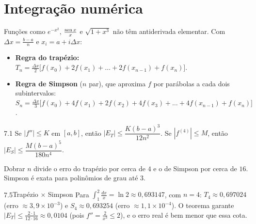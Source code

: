 \section{Integração numérica}

Funções como $e^{-x^2}$, $\frac{\operatorname{sen} x}x$ e $\sqrt{1+x^3}$ não têm antiderivada elementar. Com
$\Delta x=\frac{b-a}n$ e $x_i=a+i\Delta x$:
\begin{itemize}
\item \textbf{Regra do trapézio:}
  $T_n=\frac{\Delta x}2\big[f(x_0)+2f(x_1)+\dots+2f(x_{n-1})+f(x_n)\big]$.
\item \textbf{Regra de Simpson} ($n$ par), que aproxima $f$ por parábolas a cada dois
  subintervalos:
  $S_n=\frac{\Delta x}3\big[f(x_0)+4f(x_1)+2f(x_2)+4f(x_3)+\dots+4f(x_{n-1})+f(x_n)\big]$.
\end{itemize}

\begin{teorema}{7.1}
Se $|f''|\le K$ em $[a,b]$, então $|E_T|\le\dfrac{K(b-a)^3}{12n^2}$. Se $|f^{(4)}|\le M$, então
$|E_S|\le\dfrac{M(b-a)^5}{180n^4}$.
\end{teorema}

Dobrar $n$ divide o erro do trapézio por cerca de $4$ e o de Simpson por cerca de $16$.
Simpson é exata para polinômios de grau até $3$.


\begin{exemplo}{7.5}{Trapézio $\times$ Simpson}
Para $\int_1^2\frac{dx}x=\ln2\approx0{,}693147$, com $n=4$:
$T_4\approx0{,}697024$ (erro $\approx3{,}9\times10^{-3}$) e $S_4\approx0{,}693254$ (erro
$\approx1{,}1\times10^{-4}$). O teorema garante $|E_T|\le\frac{2\cdot1}{12\cdot16}\approx0{,}0104$
(pois $f''=\frac2{x^3}\le2$), e o erro real é bem menor que essa cota.
\end{exemplo}

